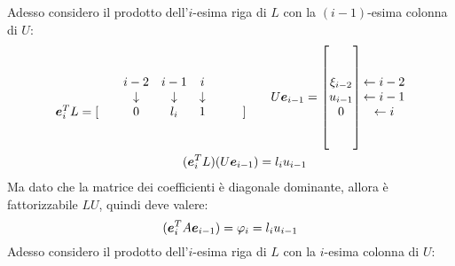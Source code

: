 Adesso considero il prodotto dell'$i$-esima riga di $L$ con la $(i-1)$-esima
colonna di $U$:
\begin{displaymath}
\begin{split}
	\begin{matrix}
		& & i-2 & i-1 & i  \\
		& & \downarrow & \downarrow & \downarrow \\
		\boldsymbol{e}_{i}^{T}L = [& & 0 & l_{i} & 1 & & &]
	\end{matrix}
	\quad & \quad
	U \boldsymbol{e}_{i-1} = \begin{bmatrix}
		\\ 
		\\ 
		\xi_{i-2} \\ 
		u_{i-1} \\
		0 \\
	 	\\
	 	\\
	\end{bmatrix} 
	\begin{matrix}
		\\ 
		\\ 
		\leftarrow i-2 \\ 
		\leftarrow i-1 \\
		\leftarrow i \\
	 	\\
	 	\\
	\end{matrix} \\
	(\boldsymbol{e}_{i}^{T}L )(U \boldsymbol{e}_{i-1}) &= l_{i} u_{i-1}
\end{split}
\end{displaymath}
Ma dato che la matrice dei coefficienti \`e diagonale dominante, allora \`e
fattorizzabile $LU$, quindi deve valere:
\begin{displaymath}
	(\boldsymbol{e}_{i}^{T} A \boldsymbol{e}_{i-1}) = \varphi_{i} = l_{i} u_{i-1}
\end{displaymath}
Adesso considero il prodotto dell'$i$-esima riga di $L$ con la $i$-esima
colonna di $U$:
